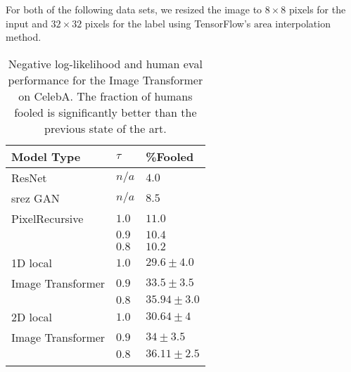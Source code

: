 \documentclass{article}
\begin{document}
For both of the following data sets, we resized the image to $8 \times 8$ pixels for the input and $32\times32$ pixels for the label using TensorFlow's $\mathrm{area}$ interpolation method.


\begin{table}[h!]
\caption{Negative log-likelihood and human eval performance for the Image Transformer on CelebA. The fraction of humans fooled is significantly better than the previous state of the art.}
\label{tab:superres_table}
\begin{center}
\vspace{2mm}
\begin{tabular}{lll}
Model Type  & $\tau$ & \%Fooled  \\
\hline
ResNet  & $n/a$ & $4.0$  \\
srez GAN  & $n/a$ & $8.5$  \\
\hline
PixelRecursive & $1.0$  & $11.0$  \\
\citep{PixelRecursiveSuperResolution} & $0.9$  & $10.4$  \\
& $0.8$  & $10.2$ \\
\hline
1D local & $1.0$  & $29.6\pm4.0$ \\
Image Transformer & $0.9$ & $33.5\pm3.5$ \\
& $0.8$ &  $\mathbf{35.94\pm3.0}$ \\
\hline
2D local & $1.0$ & $30.64\pm4$ \\
Image Transformer& $0.9$ & $34\pm3.5$  \\
& $0.8$ &  $\mathbf{36.11\pm2.5}$ \\
\bottomrule
\label{tab:CelebASuperResolution}
\end{tabular}

\end{center}
\end{table}









%
 
\end{document}
